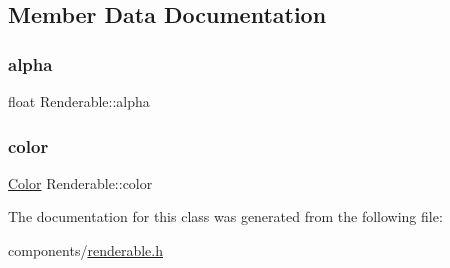 \subsection{Member Data Documentation}
\mbox{\label{classRenderable_a0776ee977fd4f79aa9e24616c39abb2d}} 
\subsubsection{\texorpdfstring{alpha}{alpha}}
{\footnotesize\ttfamily float Renderable\+::alpha}

\mbox{\label{classRenderable_ab39951f26a0f7bbd73a2328ad8a732d6}} 
\subsubsection{\texorpdfstring{color}{color}}
{\footnotesize\ttfamily \hyperlink{renderable_8h_a81c9947aa4cb6db0d6522d01e75e6c30}{Color} Renderable\+::color}



The documentation for this class was generated from the following file\+:\begin{DoxyCompactItemize}
\item 
components/\hyperlink{renderable_8h}{renderable.\+h}\end{DoxyCompactItemize}

